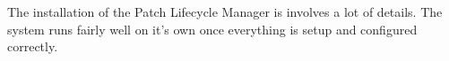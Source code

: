 The installation of the Patch Lifecycle Manager is involves a lot of details.  The system runs fairly well on it's own once everything is setup and configured correctly.








%
%
%
%
%
%
